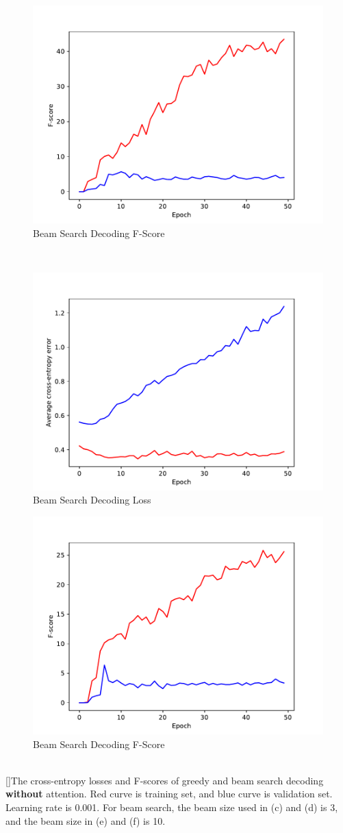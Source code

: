 \documentclass[11pt,a4paper]{article}
\begin{document}
\begin{table}[ht]
\begin{subfigure}{0.4\textwidth}\centering\includegraphics[width=0.7\columnwidth]{fig_lrn_0p001_beam_3_f.pdf}\caption{Beam Search Decoding F-Score}\end{subfigure} \\
\begin{subfigure}{0.4\textwidth}\centering\includegraphics[width=0.7\columnwidth]{fig_lrn_0p001_beam_10_loss.pdf}\caption{Beam Search Decoding Loss}\end{subfigure} %
\begin{subfigure}{0.4\textwidth}\centering\includegraphics[width=0.7\columnwidth]{fig_lrn_0p001_beam_10_f.pdf}\caption{Beam Search Decoding F-Score}\end{subfigure} \\
[]{The cross-entropy losses and F-scores of greedy and beam search decoding \textbf{without} attention. Red curve is training set, and blue curve is validation set. Learning rate is 0.001. For beam search, the beam size used in (c) and (d) is 3, and the beam size in (e) and (f) is 10.}
\label{fig:no_attn_losses_fscore}
\end{table}
\end{document}
